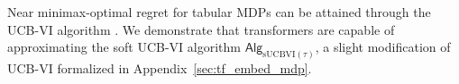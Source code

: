 \documentclass[10pt]{article}
\DeclareMathOperator*{\argmax}{arg\,max}
\newcommand{\norm}[1]{\left\|{#1}\right\|} %
\newcommand{\lone}[1]{\norm{#1}_1} %
\newcommand{\<}{\left\langle}
\renewcommand{\>}{\right\rangle}
\newcommand{\temp}{{\tau}}
\newcommand{\state}{{s}}
\newcommand{\action}{{a}}
\newcommand{\reward}{{r}}
\newcommand{\totlen}{{T}} %
\newcommand{\sAlg}{{\mathsf{Alg}}}
\newcommand{\plc}{{\pi}}
\newcommand{\Numepi}{{K}}
\newcommand{\horizon}{{H}}
\newcommand{\statesp}{{\mathcal{S}}}
\newcommand{\actionsp}{{\mathcal{A}}}
\renewcommand{\horizon}{{H}}
\newcommand{\bonus}{{b}}
\newcommand{\tresttransit}{\widehat{P}}
\newcommand{\valuefun}{{V}}
\newcommand{\Numst}{{S}}
\newcommand{\Numact}{{A}}
\newcommand{\Numvi}{{N}}
\newcommand{\Qfun}{{Q}}
\newcommand{\trestQfun}{{\widehat{\Qfun}}} %
\newcommand{\Vfun}{{\valuefun}}
\newcommand{\trestVfun}{{\widehat{\Vfun}}}
\newcommand{\sUCBVI}{{\mathrm{sUCBVI}}}
\begin{document}
Near minimax-optimal regret for tabular MDPs can be attained through the UCB-VI algorithm \citep{azar2017minimax}. We demonstrate that transformers are capable of approximating the soft UCB-VI algorithm $\sAlg_{\sUCBVI(\tau)}$, a slight modification of UCB-VI formalized in Appendix~\ref{sec:tf_embed_mdp}. 


\end{document}
